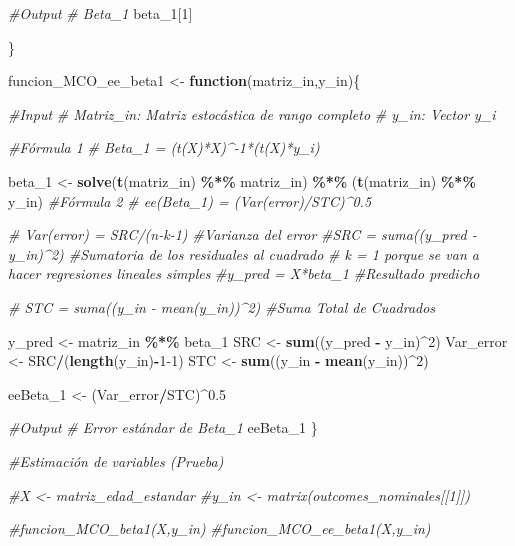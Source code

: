 \documentclass[
]{article}
\newenvironment{Shaded}{\begin{snugshade}}{\end{snugshade}}
\newcommand{\CommentTok}[1]{\textcolor[rgb]{0.56,0.35,0.01}{\textit{#1}}}
\newcommand{\ControlFlowTok}[1]{\textcolor[rgb]{0.13,0.29,0.53}{\textbf{#1}}}
\newcommand{\DecValTok}[1]{\textcolor[rgb]{0.00,0.00,0.81}{#1}}
\newcommand{\FloatTok}[1]{\textcolor[rgb]{0.00,0.00,0.81}{#1}}
\newcommand{\FunctionTok}[1]{\textcolor[rgb]{0.13,0.29,0.53}{\textbf{#1}}}
\newcommand{\NormalTok}[1]{#1}
\newcommand{\OtherTok}[1]{\textcolor[rgb]{0.56,0.35,0.01}{#1}}
\newcommand{\SpecialCharTok}[1]{\textcolor[rgb]{0.81,0.36,0.00}{\textbf{#1}}}
\begin{document}
\begin{Shaded}
\begin{Highlighting}[]
  \CommentTok{\#Output}
    \CommentTok{\# Beta\_1}
\NormalTok{    beta\_1[}\DecValTok{1}\NormalTok{]}
    
\NormalTok{\}}

\NormalTok{funcion\_MCO\_ee\_beta1 }\OtherTok{\textless{}{-}} \ControlFlowTok{function}\NormalTok{(matriz\_in,y\_in)\{}
  
  \CommentTok{\#Input}
    \CommentTok{\# Matriz\_in: Matriz estocástica de rango completo}
    \CommentTok{\# y\_in: Vector y\_i}
  
  \CommentTok{\#Fórmula 1}
  \CommentTok{\# Beta\_1 = (t(X)*X)\^{}{-}1*(t(X)*y\_i)}
    
\NormalTok{  beta\_1 }\OtherTok{\textless{}{-}} \FunctionTok{solve}\NormalTok{(}\FunctionTok{t}\NormalTok{(matriz\_in) }\SpecialCharTok{\%*\%}\NormalTok{ matriz\_in) }\SpecialCharTok{\%*\%} 
\NormalTok{              (}\FunctionTok{t}\NormalTok{(matriz\_in) }\SpecialCharTok{\%*\%}\NormalTok{   y\_in)}
  \CommentTok{\#Fórmula 2}
    \CommentTok{\# ee(Beta\_1) = (Var(error)/STC)\^{}0.5}
      
      \CommentTok{\# Var(error) = SRC/(n{-}k{-}1) \#Varianza del error}
        \CommentTok{\#SRC = suma((y\_pred {-} y\_in)\^{}2) \#Sumatoria de los residuales al           cuadrado}
        \CommentTok{\# k = 1 porque se van a hacer regresiones lineales simples}
        \CommentTok{\#y\_pred = X*beta\_1 \#Resultado predicho}
      
      \CommentTok{\# STC = suma((y\_in {-} mean(y\_in))\^{}2) \#Suma Total de Cuadrados}
    
\NormalTok{    y\_pred }\OtherTok{\textless{}{-}}\NormalTok{ matriz\_in  }\SpecialCharTok{\%*\%}\NormalTok{ beta\_1}
\NormalTok{    SRC }\OtherTok{\textless{}{-}} \FunctionTok{sum}\NormalTok{((y\_pred }\SpecialCharTok{{-}}\NormalTok{ y\_in)}\SpecialCharTok{\^{}}\DecValTok{2}\NormalTok{)}
\NormalTok{    Var\_error }\OtherTok{\textless{}{-}}\NormalTok{ SRC}\SpecialCharTok{/}\NormalTok{(}\FunctionTok{length}\NormalTok{(y\_in)}\SpecialCharTok{{-}}\DecValTok{1{-}1}\NormalTok{)}
\NormalTok{    STC }\OtherTok{\textless{}{-}} \FunctionTok{sum}\NormalTok{((y\_in }\SpecialCharTok{{-}} \FunctionTok{mean}\NormalTok{(y\_in))}\SpecialCharTok{\^{}}\DecValTok{2}\NormalTok{)}
    
\NormalTok{    eeBeta\_1 }\OtherTok{\textless{}{-}}\NormalTok{ (Var\_error}\SpecialCharTok{/}\NormalTok{STC)}\SpecialCharTok{\^{}}\FloatTok{0.5}

  \CommentTok{\#Output}
    \CommentTok{\# Error estándar de Beta\_1}
\NormalTok{   eeBeta\_1}
\NormalTok{\}}


\CommentTok{\#Estimación de variables (Prueba)}

\CommentTok{\#X \textless{}{-} matriz\_edad\_estandar}
\CommentTok{\#y\_in \textless{}{-}  matrix(outcomes\_nominales[[1]])}


\CommentTok{\#funcion\_MCO\_beta1(X,y\_in)}
\CommentTok{\#funcion\_MCO\_ee\_beta1(X,y\_in)}
\end{Highlighting}
\end{Shaded}
\end{document}
